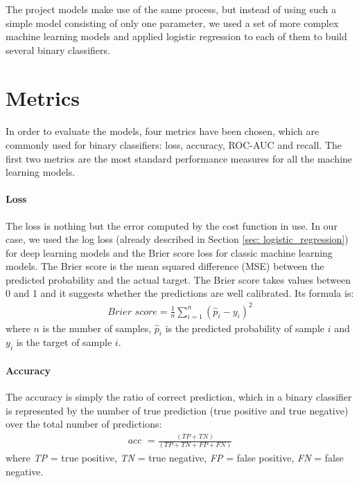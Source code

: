 The project models make use of the same process, but instead of using such a simple model consisting of only one parameter, we used a set of more complex machine learning models and applied logistic regression to each of them to build several binary classifiers.


\section{Metrics} \label{sec: metrics}
\paragraph{} In order to evaluate the models, four metrics have been chosen, which are commonly used for binary classifiers: loss, accuracy, ROC-AUC and recall. The first two metrics are the most standard performance measures for all the machine learning models.

\paragraph{Loss} The loss is nothing but the error computed by the cost function in use. In our case, we used the log loss (already described in Section \ref{sec: logistic_regression}) for deep learning models and the Brier score loss for classic machine learning models. The Brier score is the mean squared difference (MSE) between the predicted probability and the actual target. The Brier score takes values between 0 and 1 and it suggests whether the predictions are well calibrated. Its formula is:
\begin{align}
    \textit{Brier score}=\frac{1}{n} \sum_{i=1}^{n}(\hat{p}_{i} - y_{i})^{2}
\end{align}
where $n$ is the number of samples, $\hat{p}_i$ is the predicted probability of sample $i$ and $y_i$ is the target of sample $i$.

\paragraph{Accuracy} The accuracy is simply the ratio of correct prediction, which in a binary classifier is represented by the number of true prediction (true positive and true negative) over the total number of predictions:
\begin{align}
    \textit{acc } = \frac{(TP + TN)}{(TP + TN + FP + FN)}
\end{align}
where \textit{TP} = true positive, \textit{TN} = true negative, \textit{FP} = false positive, \textit{FN} = false negative.

